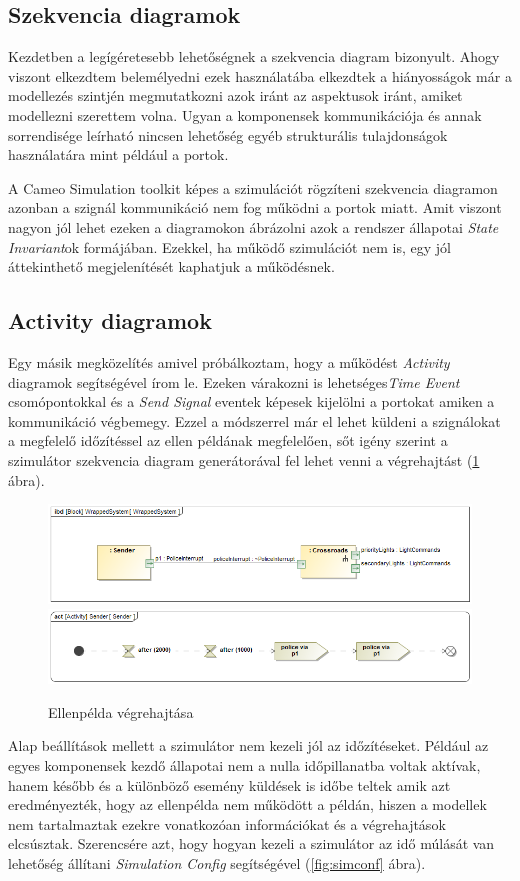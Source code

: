 \subsection{Szekvencia diagramok}

Kezdetben a legígéretesebb lehetőségnek a szekvencia diagram bizonyult. Ahogy viszont elkezdtem belemélyedni ezek használatába elkezdtek a hiányosságok már a modellezés szintjén megmutatkozni azok iránt az aspektusok iránt, amiket modellezni szerettem volna. Ugyan a komponensek kommunikációja és annak sorrendisége leírható nincsen lehetőség egyéb strukturális tulajdonságok használatára mint például a portok.

A Cameo Simulation toolkit képes a szimulációt rögzíteni szekvencia diagramon azonban a szignál kommunikáció nem fog működni a portok miatt. Amit viszont nagyon jól lehet ezeken a diagramokon ábrázolni azok a rendszer állapotai \emph{State Invariant}ok formájában. Ezekkel, ha működő szimulációt nem is, egy jól áttekinthető megjelenítését kaphatjuk a működésnek.

\subsection{Activity diagramok}
Egy másik megközelítés amivel próbálkoztam, hogy a működést \emph{Activity} diagramok segítségével írom le. Ezeken várakozni is lehetséges\emph{Time Event} csomópontokkal és a \emph{Send Signal} eventek képesek kijelölni a portokat amiken a kommunikáció végbemegy. Ezzel a módszerrel már el lehet küldeni a szignálokat a megfelelő időzítéssel az ellen példának megfelelően, sőt igény szerint a szimulátor szekvencia diagram generátorával fel lehet venni a végrehajtást (\ref{fig:activity-counter-example} ábra).
\begin{figure}[!ht]
	\centering
	\includegraphics[width=140mm, keepaspectratio]{figures/contribution/WrappedSystem1.png}
	\includegraphics[width=140mm, keepaspectratio]{figures/contribution/Sender.png}
	\caption{Ellenpélda végrehajtása}
	\label{fig:activity-counter-example}
\end{figure}
Alap beállítások mellett a szimulátor nem kezeli jól az időzítéseket. Például az egyes komponensek kezdő állapotai nem a nulla időpillanatba voltak aktívak, hanem később és a különböző esemény küldések is időbe teltek amik azt eredményezték, hogy az ellenpélda nem működött a példán, hiszen a modellek nem tartalmaztak ezekre vonatkozóan információkat és a végrehajtások elcsúsztak. Szerencsére azt, hogy hogyan kezeli a szimulátor az idő múlását van lehetőség állítani \emph{Simulation Config} segítségével (\ref{fig:simconf} ábra).

